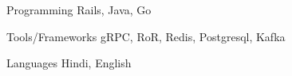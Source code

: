 

\begin{cvskills}

  \cvskill
    {Programming} %
    {Rails, Java, Go} %

  \cvskill
    {Tools/Frameworks} %
    {gRPC, RoR, Redis, Postgresql, Kafka} %

  \cvskill
    {Languages} %
    {Hindi, English} %

\end{cvskills}
